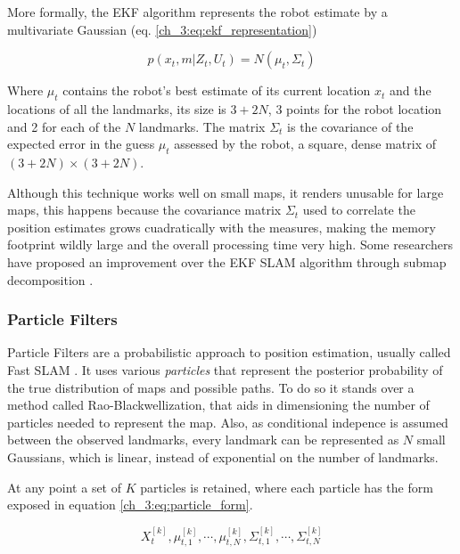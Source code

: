       More formally, the EKF algorithm represents the robot estimate by a multivariate Gaussian (eq. \ref{ch_3:eq:ekf_representation})
      
      \begin{equation} \label{ch_3:eq:ekf_representation}
        p(x_{t}, m | Z_{t}, U_{t}) = N(\mu_{t}, \Sigma_{t})
      \end{equation}

      Where $\mu_{t}$ contains the robot's best estimate of its current location $x_{t}$ and the locations of all the landmarks, its size is $3 + 2N$, 3 points for the robot location and 2 for each of the $N$ landmarks. The matrix $\Sigma_{t}$ is the covariance of the expected error in the guess $\mu_{t}$ assessed by the robot, a square, dense matrix of $(3 + 2N) \times (3 + 2N)$.

      Although this technique works well on small maps, it renders unusable for large maps, this happens because the covariance matrix $\Sigma_{t}$ used to correlate the position estimates grows cuadratically with the measures, making the memory footprint wildly large and the overall processing time very high. Some researchers have proposed an improvement over the EKF SLAM algorithm through submap decomposition \cite{Guivant2001, Leonard2000}.

    \subsubsection{Particle Filters}

      Particle Filters are a probabilistic approach to position estimation, usually called Fast SLAM \cite{Montemerlo2002}. It uses various \textit{particles} that represent the posterior probability of the true distribution of maps and possible paths. To do so it stands over a method called Rao-Blackwellization, that aids in dimensioning the number of particles needed to represent the map. Also, as conditional indepence is assumed between the observed landmarks, every landmark can be represented as $N$ small Gaussians, which is linear, instead of exponential on the number of landmarks.

      At any point a set of $K$ particles is retained, where each particle has the form exposed in equation \ref{ch_3:eq:particle_form}.

      \begin{equation} \label{ch_3:eq:particle_form}
        X_{t}^{[k]}, \mu_{t,1}^{[k]}, \cdots, \mu_{t,N}^{[k]}, \Sigma_{t,1}^{[k]}, \cdots, \Sigma_{t,N}^{[k]}
      \end{equation}

